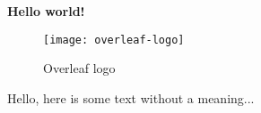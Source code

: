 \documentclass[../main.tex]{subfiles}
\begin{document}
\textbf{Hello world!}
\begin{figure}[bh]
\centering
\texttt{[image: overleaf-logo]}

\label{fig:img1}
\caption{Overleaf logo}
\end{figure}

Hello, here is some text without a meaning...
\end{document}
